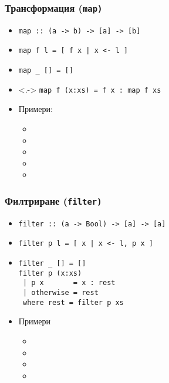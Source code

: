 \documentclass{beamer}
\begin{document}
\begin{frame}
  \frametitle{Трансформация (\tt{map})}
  \begin{itemize}[<+->]
  \item \tt{map :: (a -> b) -> [a] -> [b]}
  \item \tt{map f l = [ f x  | x <- l ]}
  \item \tt{map \_ [] = []}
  \item<.-> \tt{map f (x:xs) = f x : map f xs}
  \item Примери:
    \begin{itemize}
    \item {}
    \item {}
    \item {}
    \item {}
    \item {}
    \end{itemize}
  \end{itemize}
\end{frame}

\begin{frame}[fragile]
  \frametitle{Филтриране (\tt{filter})}
  \begin{itemize}[<+->]
  \item \tt{filter :: (a -> Bool) -> [a] -> [a]}
  \item \tt{filter p l = [ x | x <- l, p x ]}
  \item
\begin{verbatim}
filter _ [] = []
filter p (x:xs)
 | p x       = x : rest
 | otherwise = rest
 where rest = filter p xs
\end{verbatim}
  \item Примери
    \begin{itemize}
    \item {}
    \item {}
    \item {}
    \item {}
    \end{itemize}
  \end{itemize}
\end{frame}
\end{document}
